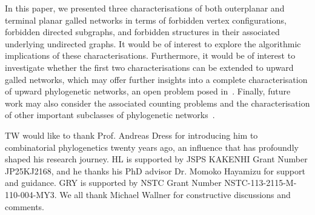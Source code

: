 \documentclass[pdflatex,sn-mathphys-num]{sn-jnl}
\theoremstyle{thmstyleone}%
\theoremstyle{thmstyletwo}%
\theoremstyle{thmstylethree}%
\begin{document}
In this paper, we presented three characterisations of both outerplanar and terminal planar galled networks in terms of forbidden vertex configurations, forbidden directed subgraphs, and forbidden structures in their associated underlying undirected graphs. It would be of interest to explore the algorithmic implications of these characterisations. Furthermore, it would be of interest to investigate whether the first two characterisations can be extended to upward galled networks, which may offer further insights into  a complete characterisation of upward phylogenetic networks, an open problem posed in~\cite{Miyaji2026}. Finally, future work may also consider the associated counting problems and the characterisation of other important subclasses of phylogenetic networks~\cite{liu2025asymptotic}.



























TW would like to thank Prof. Andreas Dress for introducing him to combinatorial phylogenetics twenty years ago, an influence that has profoundly shaped his research journey. HL is supported by JSPS KAKENHI Grant Number JP25KJ2168, and he thanks his PhD advisor Dr. Momoko Hayamizu for support and guidance. GRY is supported by NSTC Grant Number NSTC-113-2115-M-110-004-MY3. We all thank Michael Wallner for constructive discussions and comments. 
\end{document}
